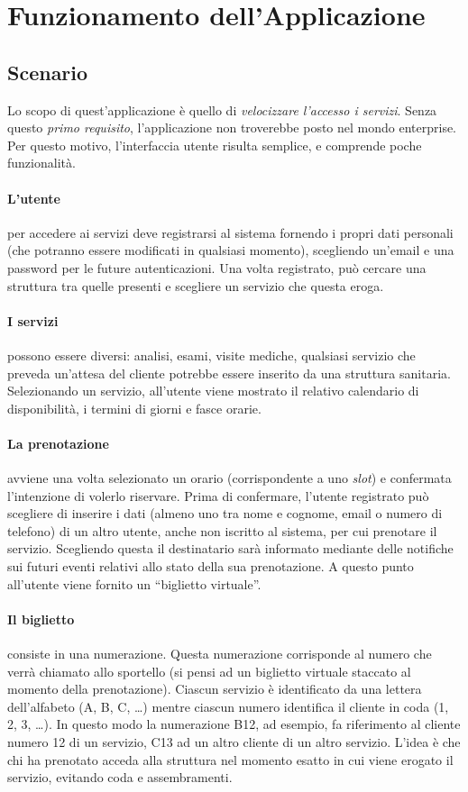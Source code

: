 \section{Funzionamento dell'Applicazione}

\subsection{Scenario}
Lo scopo di quest'applicazione è quello di \textit{velocizzare l'accesso i servizi}. Senza questo \textit{primo requisito}, l'applicazione non troverebbe posto nel mondo enterprise. Per questo motivo, l'interfaccia utente risulta semplice, e comprende poche funzionalità. 
\paragraph{L'utente} per accedere ai servizi deve registrarsi al sistema fornendo i propri dati personali (che potranno essere modificati in qualsiasi momento), scegliendo un'email e una password per le future autenticazioni. Una volta registrato, può cercare una struttura tra quelle presenti e scegliere un servizio che questa eroga. 
\paragraph{I servizi} possono essere diversi: analisi, esami, visite mediche, qualsiasi servizio che preveda un'attesa del cliente potrebbe essere inserito da una struttura sanitaria. Selezionando un servizio, all'utente viene mostrato il relativo calendario di disponibilità, i termini di giorni e fasce orarie. 
\paragraph{La prenotazione} avviene una volta selezionato un orario (corrispondente a uno \emph{slot}) e confermata l'intenzione di volerlo riservare. Prima di confermare, l'utente registrato può scegliere di inserire i dati (almeno uno tra nome e cognome, email o numero di telefono) di un altro utente, anche non iscritto al sistema, per cui prenotare il servizio. Scegliendo questa il destinatario sarà informato mediante delle notifiche sui futuri eventi relativi allo stato della sua prenotazione. A questo punto all'utente viene fornito un ``biglietto virtuale''.
\paragraph{Il biglietto} consiste in una numerazione. Questa numerazione corrisponde al numero che verrà chiamato allo sportello (si pensi ad un biglietto virtuale staccato al momento della prenotazione). Ciascun servizio è identificato da una lettera dell’alfabeto (A, B, C, \dots) mentre ciascun numero identifica il cliente in coda (1, 2, 3, \dots). In questo modo la numerazione B12, ad esempio, fa riferimento al cliente numero 12 di un servizio, C13 ad un altro cliente di un altro servizio. L’idea è che chi ha prenotato acceda alla struttura nel momento esatto in cui viene erogato il servizio, evitando coda e assembramenti.
